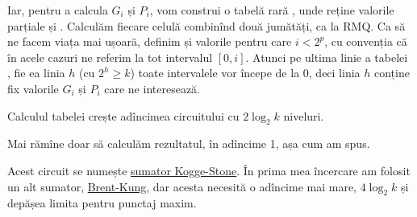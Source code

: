 \documentclass[../main.tex]{subfiles}
\begin{document}
Iar, pentru a calcula $G_i$ și $P_i$, vom construi o tabelă rară , unde  reține valorile parțiale  și . Calculăm fiecare celulă combinînd două jumătăți, ca la RMQ. Ca să ne facem viața mai ușoară, definim și valorile  pentru care $i < 2^p$, cu convenția că în acele cazuri ne referim la tot intervalul $[0, i]$. Atunci pe ultima linie a tabelei , fie ea linia $h$ (cu $2^h \geq k$) toate intervalele vor începe de la 0, deci linia $h$ conține fix valorile $G_i$ și $P_i$ care ne interesează.

Calculul tabelei  crește adîncimea circuitului cu $2 \log_2 k$ niveluri.

Mai rămîne doar să calculăm rezultatul, în adîncime 1, așa cum am spus.

Acest circuit se numește \href{https://en.wikipedia.org/wiki/Kogge\%E2\%80\%93Stone_adder}{sumator Kogge-Stone}. În prima mea încercare am folosit un alt sumator, \href{https://en.wikipedia.org/wiki/Brent\%E2\%80\%93Kung_adder}{Brent-Kung}, dar acesta necesită o adîncime mai mare, $4 \log_2 k$ și depășea limita pentru punctaj maxim.
\end{document}
